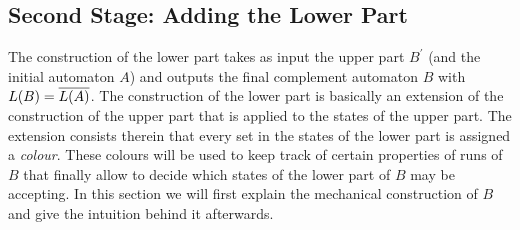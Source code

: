 




\subsection{Second Stage: Adding the Lower Part}
The construction of the lower part takes as input the upper part $B^\prime$ (and the initial automaton $A$) and outputs the final complement automaton $B$ with $L(B) = \cl1{L(A)}$. The construction of the lower part is basically an extension of the construction of the upper part that is applied to the states of the upper part. The extension consists therein that every set in the states of the lower part is assigned a \emph{colour}. These colours will be used to keep track of certain properties of runs of $B$ that finally allow to decide which states of the lower part of $B$ may be accepting. In this section we will first explain the mechanical construction of $B$ and give the intuition behind it afterwards.

